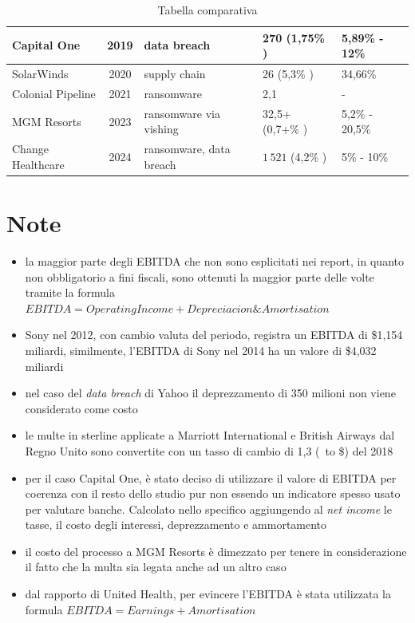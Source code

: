 \documentclass[12pt,a4paper,twoside]{report}
\begin{document}
\begin{table}[H]
{\begin{tabular}{|p{}|c|p{3cm}|p{}|p{}|}
         \hline
         Capital One & 2019 & data breach & 270  (1,75\% \cite{capital_one_2019_10k}) & 5,89\% - 12\% \\
         \hline
         SolarWinds & 2020 & supply chain & 26  (5,3\% \cite{solarwinds_2020_10k}) & 34,66\% \\
         \hline
        Colonial Pipeline & 2021 & ransomware & 2,1   & - \\
         \hline
         MGM Resorts & 2023 & ransomware via vishing & 32,5+  (0,7+\% \cite{mgm_2023_10k}) &  5,2\% - 20,5\% \\
         \hline
         Change Healthcare & 2024 & ransomware, data breach & $1\,521$  (4,2\% \cite{unh_2024_10k}) & 5\% - 10\% \\
         \hline
    \end{tabular}%
    }
    \caption{Tabella comparativa}
    \label{tab:analisys}
\end{table}

\section{Note} 
\begin{itemize}
    \item la maggior parte degli EBITDA che non sono esplicitati nei report, in quanto non obbligatorio a fini fiscali, sono ottenuti la maggior parte delle volte tramite  la formula\\ $EBITDA = Operating Income + Depreciacion\&Amortisation$
    \item Sony nel 2012, con cambio valuta del periodo, registra un EBITDA di \$1,154 miliardi, similmente, l'EBITDA di Sony nel 2014 ha un valore di \$4,032 miliardi
    \item nel caso del \textit{data breach} di Yahoo il deprezzamento di 350 milioni non viene considerato come costo 
    \item le multe in sterline applicate a  Marriott  International e
     British Airways dal Regno Unito sono convertite con un 
     tasso di cambio di 1,3 (\textsterling\ to \$) del 2018
    \item per il caso Capital One, \`e stato deciso di utilizzare il valore di 
    EBITDA per coerenza con il resto dello studio pur non essendo
    un indicatore spesso usato per valutare  banche. Calcolato nello specifico
    aggiungendo al \textit{net income} le tasse, il costo degli interessi, deprezzamento e ammortamento
    \item il costo del processo a MGM Resorts \`e dimezzato per tenere
    in considerazione il fatto che la multa sia legata anche ad un altro caso
    \item dal rapporto di United Health, per evincere l'EBITDA  \`e stata 
    utilizzata la formula $ EBITDA = Earnings + Amortisation $
\end{itemize}
\end{document}
